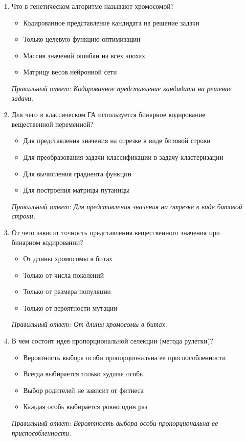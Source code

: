 \small
\begin{enumerate}[label=\textbf{\arabic*.}, leftmargin=0pt, itemsep=1.2em]
\item Что в генетическом алгоритме называют хромосомой?
\begin{itemize}[label=$\square$, leftmargin=1.5cm, itemsep=0.2em, topsep=0.3em]
\item Кодированное представление кандидата на решение задачи
\item Только целевую функцию оптимизации
\item Массив значений ошибки на всех эпохах
\item Матрицу весов нейронной сети
\end{itemize}
{\small\textit{Правильный ответ: Кодированное представление кандидата на решение задачи.}}

\item Для чего в классическом ГА используется бинарное кодирование вещественной переменной?
\begin{itemize}[label=$\square$, leftmargin=1.5cm, itemsep=0.2em, topsep=0.3em]
\item Для представления значения на отрезке в виде битовой строки
\item Для преобразования задачи классификации в задачу кластеризации
\item Для вычисления градиента функции
\item Для построения матрицы путаницы
\end{itemize}
{\small\textit{Правильный ответ: Для представления значения на отрезке в виде битовой строки.}}

\item От чего зависит точность представления вещественного значения при бинарном кодировании?
\begin{itemize}[label=$\square$, leftmargin=1.5cm, itemsep=0.2em, topsep=0.3em]
\item От длины хромосомы в битах
\item Только от числа поколений
\item Только от размера популяции
\item Только от вероятности мутации
\end{itemize}
{\small\textit{Правильный ответ: От длины хромосомы в битах.}}

\item В чем состоит идея пропорциональной селекции (метода рулетки)?
\begin{itemize}[label=$\square$, leftmargin=1.5cm, itemsep=0.2em, topsep=0.3em]
\item Вероятность выбора особи пропорциональна ее приспособленности
\item Всегда выбирается только худшая особь
\item Выбор родителей не зависит от фитнеса
\item Каждая особь выбирается ровно один раз
\end{itemize}
{\small\textit{Правильный ответ: Вероятность выбора особи пропорциональна ее приспособленности.}}


\end{enumerate}

